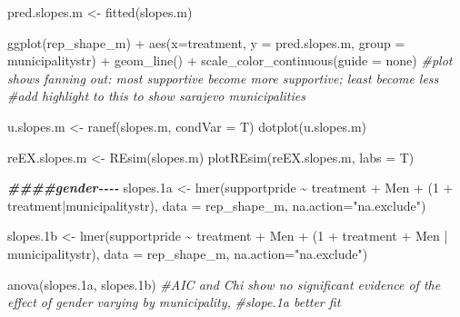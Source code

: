 \documentclass[
]{article}
\newenvironment{Shaded}{\begin{snugshade}}{\end{snugshade}}
\newcommand{\AttributeTok}[1]{\textcolor[rgb]{0.77,0.63,0.00}{#1}}
\newcommand{\CommentTok}[1]{\textcolor[rgb]{0.56,0.35,0.01}{\textit{#1}}}
\newcommand{\DecValTok}[1]{\textcolor[rgb]{0.00,0.00,0.81}{#1}}
\newcommand{\DocumentationTok}[1]{\textcolor[rgb]{0.56,0.35,0.01}{\textbf{\textit{#1}}}}
\newcommand{\FloatTok}[1]{\textcolor[rgb]{0.00,0.00,0.81}{#1}}
\newcommand{\FunctionTok}[1]{\textcolor[rgb]{0.00,0.00,0.00}{#1}}
\newcommand{\NormalTok}[1]{#1}
\newcommand{\OtherTok}[1]{\textcolor[rgb]{0.56,0.35,0.01}{#1}}
\newcommand{\SpecialCharTok}[1]{\textcolor[rgb]{0.00,0.00,0.00}{#1}}
\newcommand{\StringTok}[1]{\textcolor[rgb]{0.31,0.60,0.02}{#1}}
\begin{document}
\begin{Shaded}
\begin{Highlighting}[]
\NormalTok{pred.slopes.m }\OtherTok{\textless{}{-}} \FunctionTok{fitted}\NormalTok{(slopes.m)}

\FunctionTok{ggplot}\NormalTok{(rep\_shape\_m) }\SpecialCharTok{+}
  \FunctionTok{aes}\NormalTok{(}\AttributeTok{x=}\NormalTok{treatment, }\AttributeTok{y =}\NormalTok{ pred.slopes.m, }\AttributeTok{group =}\NormalTok{ municipalitystr) }\SpecialCharTok{+}
  \FunctionTok{geom\_line}\NormalTok{() }\SpecialCharTok{+}
  \FunctionTok{scale\_color\_continuous}\NormalTok{(}\AttributeTok{guide =} \StringTok{\textquotesingle{}none\textquotesingle{}}\NormalTok{) }
\CommentTok{\#plot shows fanning out: most supportive become more supportive; least become less}
\CommentTok{\#add highlight to this to show sarajevo municipalities}

\NormalTok{u.slopes.m }\OtherTok{\textless{}{-}} \FunctionTok{ranef}\NormalTok{(slopes.m, }\AttributeTok{condVar =}\NormalTok{ T)}
\FunctionTok{dotplot}\NormalTok{(u.slopes.m)}

\NormalTok{reEX.slopes.m }\OtherTok{\textless{}{-}}  \FunctionTok{REsim}\NormalTok{(slopes.m)}
\FunctionTok{plotREsim}\NormalTok{(reEX.slopes.m, }\AttributeTok{labs =}\NormalTok{ T)}

\DocumentationTok{\#\#\#\#gender{-}{-}{-}{-}}
\NormalTok{slopes}\FloatTok{.1}\NormalTok{a }\OtherTok{\textless{}{-}} \FunctionTok{lmer}\NormalTok{(supportpride }\SpecialCharTok{\textasciitilde{}}\NormalTok{ treatment }\SpecialCharTok{+}\NormalTok{ Men }\SpecialCharTok{+}\NormalTok{ (}\DecValTok{1} \SpecialCharTok{+}\NormalTok{ treatment}\SpecialCharTok{|}\NormalTok{municipalitystr),}
                  \AttributeTok{data =}\NormalTok{ rep\_shape\_m, }\AttributeTok{na.action=}\StringTok{"na.exclude"}\NormalTok{)}

\NormalTok{slopes}\FloatTok{.1}\NormalTok{b }\OtherTok{\textless{}{-}} \FunctionTok{lmer}\NormalTok{(supportpride }\SpecialCharTok{\textasciitilde{}}\NormalTok{ treatment }\SpecialCharTok{+}\NormalTok{ Men }\SpecialCharTok{+}\NormalTok{ (}\DecValTok{1} \SpecialCharTok{+}\NormalTok{ treatment }\SpecialCharTok{+}\NormalTok{ Men }\SpecialCharTok{|}\NormalTok{ municipalitystr),}
                  \AttributeTok{data =}\NormalTok{ rep\_shape\_m, }\AttributeTok{na.action=}\StringTok{"na.exclude"}\NormalTok{)}

\FunctionTok{anova}\NormalTok{(slopes}\FloatTok{.1}\NormalTok{a, slopes}\FloatTok{.1}\NormalTok{b)}
\CommentTok{\#AIC and Chi show no significant evidence of the effect of gender varying by municipality, }
\CommentTok{\#slope.1a better fit}


\end{Highlighting}
\end{Shaded}
\end{document}
